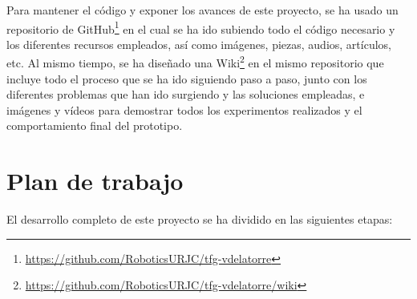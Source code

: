 Para mantener el código y exponer los avances de este proyecto, se ha usado un repositorio de GitHub\footnote{\url{https://github.com/RoboticsURJC/tfg-vdelatorre}} en el cual se ha ido subiendo todo el código necesario y los diferentes recursos empleados, así como imágenes, piezas, audios, artículos, etc. Al mismo tiempo, se ha diseñado una Wiki\footnote{\url{https://github.com/RoboticsURJC/tfg-vdelatorre/wiki}} en el mismo repositorio que incluye todo el proceso que se ha ido siguiendo paso a paso, junto con los diferentes problemas que han ido surgiendo y las soluciones empleadas, e imágenes y vídeos para demostrar todos los experimentos realizados y el comportamiento final del prototipo.

\section{Plan de trabajo}
\label{sec:plantrabajo}

El desarrollo completo de este proyecto se ha dividido en las siguientes etapas:

